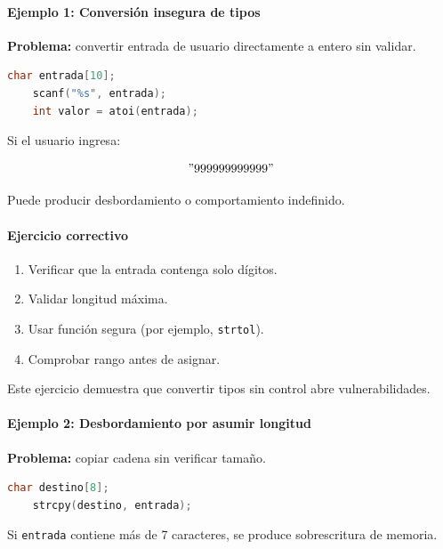 \documentclass[12pt,twoside]{book}
\begin{document}
						\paragraph{Ejemplo 1: Conversión insegura de tipos}
						
						\noindent
						\textbf{Problema:} convertir entrada de usuario directamente a entero sin validar.
						
						\begin{lstlisting}[language=C]
	char entrada[10];
	scanf("%s", entrada);
	int valor = atoi(entrada); \end{lstlisting}
						
						\noindent
						Si el usuario ingresa:
						
						\[
						"999999999999"
						\]
						
						Puede producir desbordamiento o comportamiento indefinido.
						
						\paragraph{Ejercicio correctivo}
						
						\begin{enumerate}
							\item Verificar que la entrada contenga solo dígitos.
							\item Validar longitud máxima.
							\item Usar función segura (por ejemplo, \texttt{strtol}).
							\item Comprobar rango antes de asignar.
						\end{enumerate}
						
						\noindent
						Este ejercicio demuestra que convertir tipos sin control abre vulnerabilidades.
						
						\paragraph{Ejemplo 2: Desbordamiento por asumir longitud}
						
						\noindent
						\textbf{Problema:} copiar cadena sin verificar tamaño.
						
						\begin{lstlisting}[language=C]
	char destino[8];
	strcpy(destino, entrada); \end{lstlisting}
						
						\noindent
						Si \texttt{entrada} contiene más de 7 caracteres, se produce sobrescritura de memoria.
						
\end{document}
